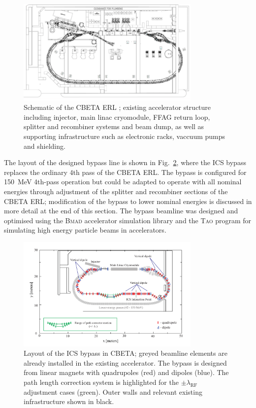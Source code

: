 \documentclass[../main.tex]{subfiles}
\begin{document}
\begin{figure}[!h]
\centering
\includegraphics[width=0.8\textwidth]{Figures/CBETA_Inverse_Compton_Source_Design/CBETA_schematic.pdf}
\caption{Schematic of the CBETA ERL \cite{hoffstaetter2017cbeta}; existing accelerator structure including injector, main linac cryomodule, FFAG return loop, splitter and recombiner systems and beam dump, as well as supporting infrastructure such as electronic racks, vaccuum pumps and shielding.}
\label{fig:CBETA_schematic}
\end{figure}

The layout of the designed bypass line is shown in Fig.~\ref{fig:CBETA_ICS_Layout}, where the ICS bypass replaces the ordinary 4th pass of the CBETA ERL. The bypass is configured for 150~\si{\mega\electronvolt} 4th-pass operation but could be adapted to operate with all nominal energies through adjustment of the splitter and recombiner sections of the CBETA ERL; modification of the bypass to lower nominal energies is discussed in more detail at the end of this section. The bypass beamline was designed and optimised using the \textsc{Bmad} accelerator simulation library \cite{BmadManual} and the \textsc{Tao} program \cite{TaoManual} for simulating high
energy particle beams in accelerators.

\begin{figure}[!h]
\centering
\includegraphics[width=0.8\textwidth]{Figures/CBETA_Inverse_Compton_Source_Design/cbetaicslayout.pdf}
\caption{Layout of the ICS bypass in CBETA; greyed beamline elements are already installed in the existing accelerator. The bypass is designed from linear magnets with quadrupoles (red) and dipoles (blue). The path length correction system is highlighted for the $\pm\lambda_{\mathrm{RF}}$ adjustment cases (green). Outer walls and relevant existing infrastructure shown in black.}
\label{fig:CBETA_ICS_Layout}
\end{figure}
\end{document}
